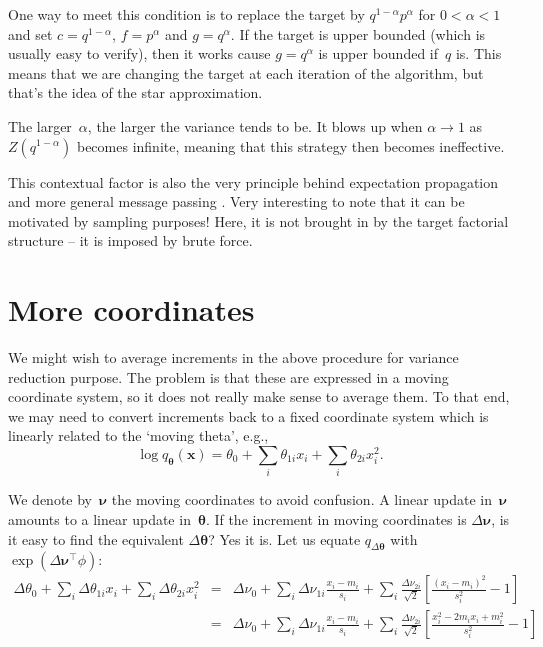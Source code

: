\documentclass{article}
\def\x{\mathbf{x}}
\def\th{{\boldsymbol{\theta}}}
\def\n{{\boldsymbol{\nu}}}
\def\u{\mathbf{u}}
\begin{document}
One way to meet this condition is to replace the target by $q^{1-\alpha}p^\alpha$ for $0<\alpha<1$ and set $c=q^{1-\alpha}$, $f=p^\alpha$ and $g=q^\alpha$. If the target is upper bounded (which is usually easy to verify), then it works cause $g=q^\alpha$ is upper bounded if~$q$ is. This means that we are changing the target at each iteration of the algorithm, but that's the idea of the star approximation. 

The larger~$\alpha$, the larger the variance tends to be. It blows up when $\alpha\to 1$ as $Z(q^{1-\alpha})$ becomes infinite, meaning that this strategy then becomes ineffective. 


This contextual factor is also the very principle behind expectation propagation and more general message passing \cite{Minka-05}. Very interesting to note that it can be motivated by sampling purposes! Here, it is not brought in by the target factorial structure -- it is imposed by brute force. 



\section{More coordinates}

We might wish to average increments in the above procedure for variance reduction purpose. The problem is that these are expressed in a moving coordinate system, so it does not really make sense to average them. To that end, we may need to convert increments back to a fixed coordinate system which is linearly related to the `moving theta', e.g.,
$$
\log q_\th(\x) = \theta_0 + \sum_i \theta_{1i} x_i + \sum_i \theta_{2i} x_i^2 .
$$

We denote by~$\n$ the moving coordinates to avoid confusion. A linear update in~$\n$ amounts to a linear update in~$\th$. If the increment in moving coordinates is $\Delta\n$, is it easy to find the equivalent $\Delta\th$? Yes it is. Let us equate $q_{\Delta\th}$ with $\exp(\Delta\n^\top \phi)$:
\begin{eqnarray*}
\Delta\theta_0 + \sum_i \Delta\theta_{1i} x_i + \sum_i \Delta\theta_{2i} x_i^2
& = & 
\Delta\nu_0 
+ \sum_i \Delta\nu_{1i} \frac{x_i-m_i}{s_i} 
+ \sum_i \frac{\Delta\nu_{2i}}{\sqrt{2}} \left[\frac{(x_i-m_i)^2}{s_i^2}-1\right] \\
& = & 
\Delta\nu_0 
+ \sum_i \Delta\nu_{1i} \frac{x_i-m_i}{s_i}
+ \sum_i \frac{\Delta\nu_{2i}}{\sqrt{2}} 
\left[\frac{x_i^2 - 2m_ix_i + m_i^2}{s_i^2}-1\right]
\end{eqnarray*}
\end{document}
